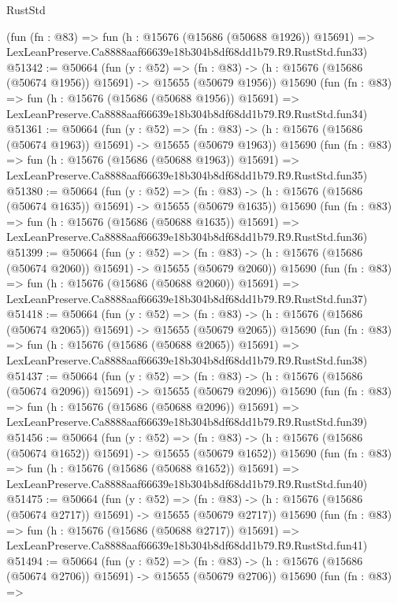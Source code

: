 \begin{lexlean}{RustStd}
\begin{coremodule}
    (fun (fn : @83) =>
    fun (h : @15676 (@15686 (@50688 @1926)) @15691) =>
    LexLeanPreserve.Ca8888aaf66639e18b304b8df68dd1b79.R9.RustStd.fun33)
@51342 := @50664
    (fun (y : @52) =>
    (fn : @83) -> (h : @15676 (@15686 (@50674 @1956)) @15691) -> @15655 (@50679 @1956))
    @15690
    (fun (fn : @83) =>
    fun (h : @15676 (@15686 (@50688 @1956)) @15691) =>
    LexLeanPreserve.Ca8888aaf66639e18b304b8df68dd1b79.R9.RustStd.fun34)
@51361 := @50664
    (fun (y : @52) =>
    (fn : @83) -> (h : @15676 (@15686 (@50674 @1963)) @15691) -> @15655 (@50679 @1963))
    @15690
    (fun (fn : @83) =>
    fun (h : @15676 (@15686 (@50688 @1963)) @15691) =>
    LexLeanPreserve.Ca8888aaf66639e18b304b8df68dd1b79.R9.RustStd.fun35)
@51380 := @50664
    (fun (y : @52) =>
    (fn : @83) -> (h : @15676 (@15686 (@50674 @1635)) @15691) -> @15655 (@50679 @1635))
    @15690
    (fun (fn : @83) =>
    fun (h : @15676 (@15686 (@50688 @1635)) @15691) =>
    LexLeanPreserve.Ca8888aaf66639e18b304b8df68dd1b79.R9.RustStd.fun36)
@51399 := @50664
    (fun (y : @52) =>
    (fn : @83) -> (h : @15676 (@15686 (@50674 @2060)) @15691) -> @15655 (@50679 @2060))
    @15690
    (fun (fn : @83) =>
    fun (h : @15676 (@15686 (@50688 @2060)) @15691) =>
    LexLeanPreserve.Ca8888aaf66639e18b304b8df68dd1b79.R9.RustStd.fun37)
@51418 := @50664
    (fun (y : @52) =>
    (fn : @83) -> (h : @15676 (@15686 (@50674 @2065)) @15691) -> @15655 (@50679 @2065))
    @15690
    (fun (fn : @83) =>
    fun (h : @15676 (@15686 (@50688 @2065)) @15691) =>
    LexLeanPreserve.Ca8888aaf66639e18b304b8df68dd1b79.R9.RustStd.fun38)
@51437 := @50664
    (fun (y : @52) =>
    (fn : @83) -> (h : @15676 (@15686 (@50674 @2096)) @15691) -> @15655 (@50679 @2096))
    @15690
    (fun (fn : @83) =>
    fun (h : @15676 (@15686 (@50688 @2096)) @15691) =>
    LexLeanPreserve.Ca8888aaf66639e18b304b8df68dd1b79.R9.RustStd.fun39)
@51456 := @50664
    (fun (y : @52) =>
    (fn : @83) -> (h : @15676 (@15686 (@50674 @1652)) @15691) -> @15655 (@50679 @1652))
    @15690
    (fun (fn : @83) =>
    fun (h : @15676 (@15686 (@50688 @1652)) @15691) =>
    LexLeanPreserve.Ca8888aaf66639e18b304b8df68dd1b79.R9.RustStd.fun40)
@51475 := @50664
    (fun (y : @52) =>
    (fn : @83) -> (h : @15676 (@15686 (@50674 @2717)) @15691) -> @15655 (@50679 @2717))
    @15690
    (fun (fn : @83) =>
    fun (h : @15676 (@15686 (@50688 @2717)) @15691) =>
    LexLeanPreserve.Ca8888aaf66639e18b304b8df68dd1b79.R9.RustStd.fun41)
@51494 := @50664
    (fun (y : @52) =>
    (fn : @83) -> (h : @15676 (@15686 (@50674 @2706)) @15691) -> @15655 (@50679 @2706))
    @15690
    (fun (fn : @83) =>

\end{coremodule}
\end{lexlean}
